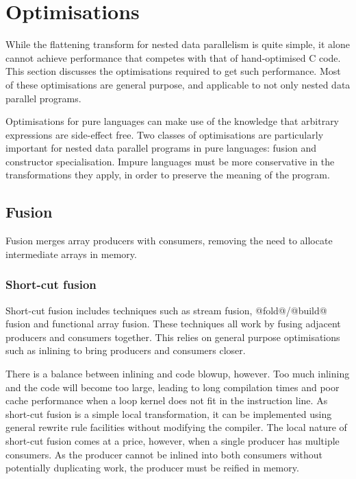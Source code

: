\section{Optimisations}

While the flattening transform for nested data parallelism is quite simple,
it alone cannot achieve performance that competes with that of hand-optimised C code.
This section discusses the optimisations required to get such performance.
Most of these optimisations are general purpose, and applicable to not only nested data parallel programs.

Optimisations for pure languages can make use of the knowledge that arbitrary expressions are side-effect free.
Two classes of optimisations are particularly important for nested data parallel programs in pure languages: fusion and constructor specialisation.
Impure languages must be more conservative in the transformations they apply, in order to preserve the meaning of the program.


\subsection{Fusion}

Fusion merges array producers with consumers, removing the need to allocate intermediate arrays in memory.


\subsubsection{Short-cut fusion}

Short-cut fusion includes techniques such as stream fusion\cite{coutts2007streamfusion},
@fold@/@build@ fusion\cite{gill1993shortcut}
and functional array fusion\cite{chakravarty2001functional, chakravarty2003approach}.
These techniques all work by fusing adjacent producers and consumers together.
This relies on general purpose optimisations such as inlining to bring producers and consumers closer. 

There is a balance between inlining and code blowup, however.
Too much inlining and the code will become too large, leading to long compilation times and poor cache performance when a loop kernel does not fit in the instruction line.
As short-cut fusion is a simple local transformation, it can be implemented using general rewrite rule facilities\cite{jones2001playingby} without modifying the compiler.
The local nature of short-cut fusion comes at a price, however, when a single producer has multiple consumers.
As the producer cannot be inlined into both consumers without potentially duplicating work, the producer must be reified in memory.

